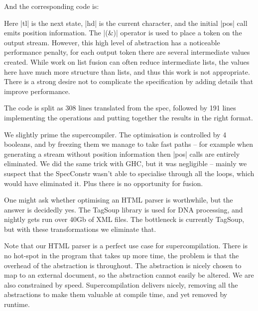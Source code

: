 \documentclass{sigplanconf}
\begin{document}
And the corresponding code is:


Here |tl| is the next state, |hd| is the current character, and the initial |pos| call emits position information. The |(&)| operator is used to place a token on the output stream. However, this high level of abstraction has a noticeable performance penalty, for each output token there are several intermediate values created. While work on list fusion can often reduce intermediate lists, the values here have much more structure than lists, and thus this work is not appropriate. There is a strong desire not to complicate the specification by adding details that improve performance.

The code is split as 308 lines translated from the spec, followed by 191 lines implementing the operations and putting together the results in the right format.

We slightly prime the supercompiler. The optimisation is controlled by 4 booleans, and by freezing them we manage to take fast paths -- for example when generating a stream without position information then |pos| calls are entirely eliminated. We did the same trick with GHC, but it was negligible -- mainly we suspect that the SpecConstr wasn't able to specialise through all the loops, which would have eliminated it. Plus there is no opportunity for fusion.

One might ask whether optimising an HTML parser is worthwhile, but the answer is decidedly yes. The TagSoup library is used for DNA processing, and nightly gets run over 40Gb of XML files. The bottleneck is currently TagSoup, but with these transformations we eliminate that.

Note that our HTML parser is a perfect use case for supercompilation. There is no hot-spot in the program that takes up more time, the problem is that the overhead of the abstraction is throughout. The abstraction is nicely chosen to map to an external document, so the abstraction cannot easily be altered. We are also constrained by speed. Supercompilation delivers nicely, removing all the abstractions to make them valuable at compile time, and yet removed by runtime.
\end{document}

